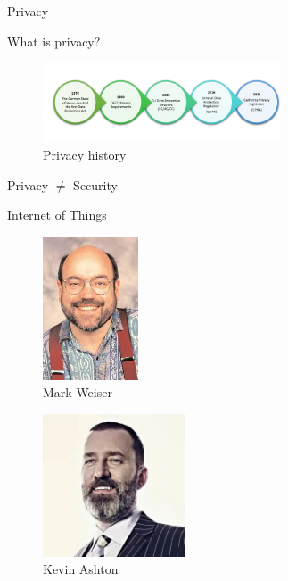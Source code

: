 \documentclass[xcolor={svgnames},aspectratio=169]{beamer}
\begin{document}
\begin{frame}{Privacy}
    \begin{multicols}{2}
        What is privacy?
        \begin{figure}
            \centering\includegraphics[width=200pt]{assets/images/privacy_history.png}
            \caption{Privacy history \cite{MukherjeePrivacy}}
        \end{figure}

        \columnbreak
        \centering
        \vspace*{\fill}
        Privacy $\ne$ Security
        \vspace*{\fill}
    \end{multicols}
\end{frame}

\begin{frame}{Internet of Things}
    \begin{multicols}{2}
        \begin{figure}
            \centering\includegraphics[width=80pt]{assets/images/mark_weiser.png}
            \caption{Mark Weiser \cite{weiser1991computer}}
        \end{figure}

        \columnbreak
        \begin{figure}
            \centering\includegraphics[width=120pt]{assets/images/kevin_ashton.png}
            \caption{Kevin Ashton \cite{KevinThat}}
        \end{figure}
    \end{multicols}
\end{frame}
\end{document}
